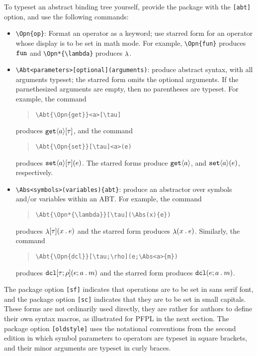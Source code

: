 \documentclass[11pt]{article}
\begin{document}
To typeset an abstract binding tree yourself, provide the package with the \verb|[abt]| option, and use the following commands:
\begin{itemize}
  \item \verb|\Opn{op}|: Format an operator as a keyword; use starred form for an operator whose display is to be set in math mode.  For example, \verb|\Opn{fun}| produces $\Opn{fun}$ and \verb|\Opn*{\lambda}| produces $\Opn*{\lambda}$.
  \item \verb|\Abt<parameters>[optional](arguments)|: produce abstract syntax, with all arguments typeset; the starred form omits the optional arguments.  If the parnethesized arguments are empty, then no parentheses are typeset.  For example, the command
  \begin{quote}
\begin{verbatim}
\Abt{\Opn{get}}<a>[\tau]
\end{verbatim}
  \end{quote}
  produces $\Abt{\Opn{get}}<a>[\tau]$, and the command
  \begin{quote}
\begin{verbatim}
\Abt{\Opn{set}}[\tau]<a>(e)
\end{verbatim}
  \end{quote}
  produces $\Abt{\Opn{set}}<a>[\tau](e)$.  The starred forms produce $\Abt*{\Opn{get}}<a>[\tau]$, and $\Abt*{\Opn{set}}<a>[\tau](e)$, respectively.

  \item \verb|\Abs<symbols>(variables){abt}|: produce an abstractor over symbols and/or variables within an ABT.  For example, the command
  \begin{quote}
\begin{verbatim}
\Abt{\Opn*{\lambda}}[\tau](\Abs(x){e})
\end{verbatim}
  \end{quote}
  produces $\Abt{\Opn*{\lambda}}[\tau](\Abs(x){e})$ and the starred form produces $\Abt*{\Opn*{\lambda}}[\tau](\Abs(x){e})$.  Similarly, the command
  \begin{quote}
\begin{verbatim}
\Abt{\Opn{dcl}}[\tau;\rho](e;\Abs<a>{m})
\end{verbatim}
  \end{quote}
  produces $\Abt{\Opn{dcl}}[\tau;\rho](e;\Abs<a>{m})$ and the starred form produces $\Abt*{\Opn{dcl}}[\tau\,\rho](e;\Abs<a>{m})$.
\end{itemize}
The package option \verb|[sf]| indicates that operations are to be set in sans serif font, and the package option \verb|[sc]| indicates that they are to be set in small capitals.  These forms are not ordinarily used directly, they are rather for authors to define their own syntax macros, as illustrated for \textsf{PFPL} in the next section.  The package option \verb|[oldstyle]| uses the notational conventions from the second edition in which symbol parameters to operators are typeset in square brackets, and their minor arguments are typeset in curly braces.
\end{document}
